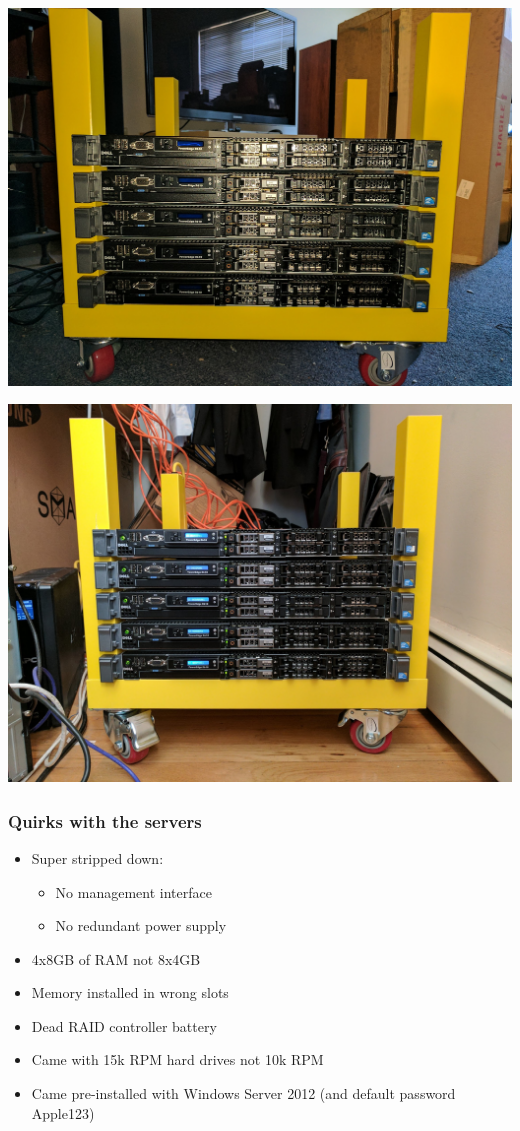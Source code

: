 \documentclass[aspectratio=169,11pt,hyperref={colorlinks=true}]{beamer}
\begin{document}
\begin{frame}
    \centering
    \includegraphics[width=.75\textwidth]{lack_rack.jpg}
\end{frame}

\begin{frame}
    \centering
    \includegraphics[width=.9\textwidth]{data_closet.jpg}
\end{frame}

\begin{frame}
    \frametitle{Quirks with the servers}
    \begin{itemize}
        \item Super stripped down:
            \begin{itemize}
                \item No management interface
                \item No redundant power supply
            \end{itemize}
        \item 4x8GB of RAM not 8x4GB
        \item Memory installed in wrong slots
        \item Dead RAID controller battery
        \item Came with 15k RPM hard drives not 10k RPM
        \item Came pre-installed with Windows Server 2012 (and default password Apple123)
    \end{itemize}
\end{frame}
\end{document}
